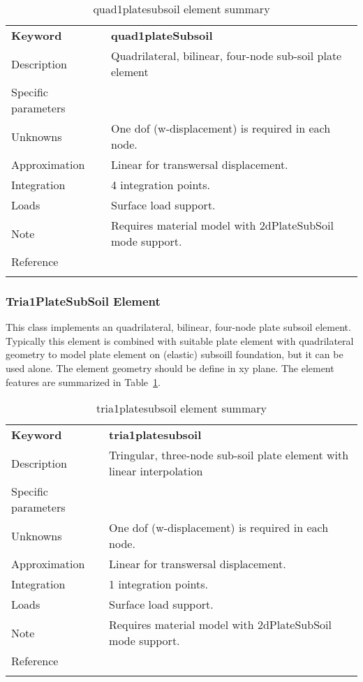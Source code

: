 \documentclass[a4paper]{article}
\newcommand{\param}[1]{\texttt{#1}} %
\newcommand{\templabel}{}%
\newcommand{\tempcaption}{}%
\newcounter{nelpar}
\newenvironment{elementsummary}[5]{%
  \gdef\tempcaption{#4}%
  \gdef\templabel{#5}%
  \setcounter{nelpar}{0}%
  \begin{center} %
    \begin{table}[!htb] %
      \begin{tabular}{|l|p{9cm}|}\hline %
        {\bf Keyword} & \bf{#1}\\ %
        {Description} & {#2}\\ %
        {Specific parameters} & {#3}\\ \hline %
}{
  \\ \hline %
      \end{tabular}%
      \caption{\tempcaption}%
      \label{\templabel}%
    \end{table}%
  \end{center}%
}
\newcommand{\elementParam}[1]{%
  \ifthenelse{\value{nelpar}>0} %
             {&{#1}}%
             {\setcounter{nelpar}{1}Parameters&{#1}}%
             \\%
}
\newcommand{\elementDescription}[2]{{#1} & {#2}\\ }
\begin{document}
\begin{elementsummary}{quad1plateSubsoil}{Quadrilateral, bilinear, four-node sub-soil plate element}{}{quad1platesubsoil element summary}{quad1platesubsoilsummary}
\elementDescription{Unknowns}{One dof (w-displacement) is required in each node.}
\elementDescription{Approximation}{Linear for transwersal displacement.}
\elementDescription{Integration}{4 integration points.}
\elementDescription{Loads}{Surface load support.}
\elementDescription{Note}{Requires material model with 2dPlateSubSoil mode support.}
\elementDescription{Reference}{\cite{BittnarSejnoha1996}}
\end{elementsummary}

\subsubsection{Tria1PlateSubSoil Element} \label{tria1platesubsoil}
This class implements an quadrilateral, bilinear, four-node plate subsoil element.
Typically this element is combined with suitable plate element with quadrilateral geometry to model plate element on 
(elastic) subsoill foundation, but it can be used alone. The element geometry should be define in xy plane.
The element features are summarized in Table~\ref{quad1platesubsoilsummary}.

\begin{elementsummary}{tria1platesubsoil}{Tringular, three-node sub-soil plate element with linear interpolation}{}{tria1platesubsoil element summary}{tria1platesubsoilsummary}
\elementDescription{Unknowns}{One dof (w-displacement) is required in each node.}
\elementDescription{Approximation}{Linear for transwersal displacement.}
\elementDescription{Integration}{1 integration points.}
\elementDescription{Loads}{Surface load support.}
\elementDescription{Note}{Requires material model with 2dPlateSubSoil mode support.}
\elementDescription{Reference}{\cite{BittnarSejnoha1996}}
\end{elementsummary}


\clearpage
\end{document}
